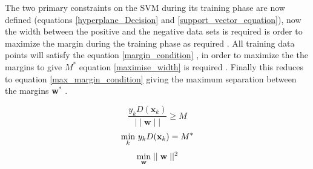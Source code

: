 \documentclass[12pt,a4paper]{article}
\begin{document}
The two primary constraints on the SVM during its training phase are now defined (equations \ref{hyperplane_Decision} and \ref{support_vector_equation}), now the width between the positive and the negative data sets is required is order to maximize the margin during the training phase as required \cite{kernelSVMs1992}. All training data points will satisfy the equation \ref{margin_condition} \cite{kernelSVMs1992}, in order to maximize the the margins to give $M^*$ equation \ref{maximise_width} is required \cite{kernelSVMs1992}. Finally this reduces to equation \ref{max_margin_condition} giving the maximum separation between the margins \textbf{w$^*$} \cite{kernelSVMs1992}.   

\begin{equation}
\frac{y_k D(\textbf{x$_k$})}{\mid\mid{\textbf{w}}\mid\mid} \geq M
\label{margin_condition}
\end{equation}
\begin{equation}
\underset{k}{\textnormal{min}} ~  y_k D(\textbf{x$_k$}) = M^*
\label{maximise_width}
\end{equation}
\begin{equation}
\underset{\textbf{w}}{\textnormal{min}} \mid\mid \textbf{w} \mid\mid ^2
\label{max_margin_condition}
\end{equation}
\end{document}
